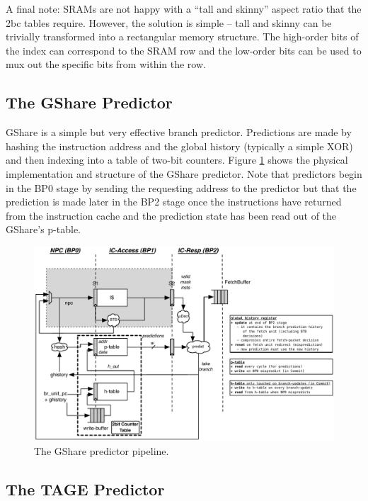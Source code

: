 A final note: SRAMs are not happy with a ``tall and skinny'' aspect ratio that the 2bc tables require. However, the solution is simple -- tall and skinny can be trivially transformed into a rectangular memory structure.  The high-order bits of the index can correspond to the SRAM row and the low-order bits can be used to mux out the specific bits from within the row. 

\subsection{The GShare Predictor}

GShare is a simple but very effective branch predictor. Predictions are made by hashing the instruction address and the global history (typically a simple XOR) and then indexing into a table of two-bit counters.  Figure \ref{fig:gshare} shows the physical implementation and structure of the GShare predictor. Note that predictors begin in the BP0 stage by sending the requesting address to the predictor but that the prediction is made later in the BP2 stage once the instructions have returned from the instruction cache and the prediction state has been read out of the GShare's p-table.


\begin{figure}[ht]
	\centering
	\centerline{\includegraphics[scale =0.95] {figures/gshare}}
	\caption{ \small The GShare predictor pipeline.}
	\label{fig:gshare}
\end{figure}

\subsection{The TAGE Predictor}\label{sec:tage}

